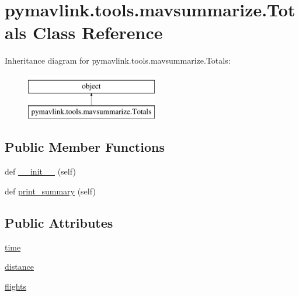 \hypertarget{classpymavlink_1_1tools_1_1mavsummarize_1_1Totals}{}\section{pymavlink.\+tools.\+mavsummarize.\+Totals Class Reference}
\label{classpymavlink_1_1tools_1_1mavsummarize_1_1Totals}
Inheritance diagram for pymavlink.\+tools.\+mavsummarize.\+Totals\+:\begin{figure}[H]
\begin{center}
\leavevmode
\includegraphics[height=2.000000cm]{classpymavlink_1_1tools_1_1mavsummarize_1_1Totals}
\end{center}
\end{figure}
\subsection*{Public Member Functions}
\begin{DoxyCompactItemize}
\item 
def \mbox{\hyperlink{classpymavlink_1_1tools_1_1mavsummarize_1_1Totals_ae1e7634a5a5773d76f27b18ab18c3ed7}{\+\_\+\+\_\+init\+\_\+\+\_\+}} (self)
\item 
def \mbox{\hyperlink{classpymavlink_1_1tools_1_1mavsummarize_1_1Totals_a9eeac7c9507bd37d9ec74306996952ab}{print\+\_\+summary}} (self)
\end{DoxyCompactItemize}
\subsection*{Public Attributes}
\begin{DoxyCompactItemize}
\item 
\mbox{\hyperlink{classpymavlink_1_1tools_1_1mavsummarize_1_1Totals_ae80f37b87665285091c33bdc8a7b3b87}{time}}
\item 
\mbox{\hyperlink{classpymavlink_1_1tools_1_1mavsummarize_1_1Totals_a6870dae3b849727b5dbabcc8715de751}{distance}}
\item 
\mbox{\hyperlink{classpymavlink_1_1tools_1_1mavsummarize_1_1Totals_a6dd092e8fd7d6e18d60d167df37d4d06}{flights}}
\end{DoxyCompactItemize}


